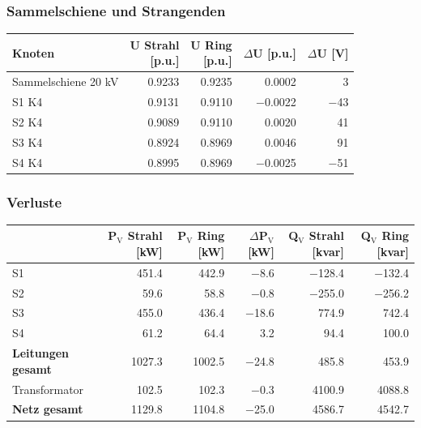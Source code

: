 \documentclass[11pt,a4paper]{article}
\begin{document}
\subsubsection{Sammelschiene und Strangenden}

\begin{table}[H]
\centering
\begin{adjustbox}{max width=\linewidth}
\begin{tabular}{lrrrr}
\toprule
\textbf{Knoten} & \thead{U Strahl \\ {[p.u.]}} & \thead{U Ring \\ {[p.u.]}} & \thead{$\Delta$U \\ {[p.u.]}} & \thead{$\Delta$U \\ {[V]}} \\
\midrule
Sammelschiene 20 kV & 0.9233 & 0.9235 & 0.0002 & 3 \\
S1 K4 & 0.9131 & 0.9110 & $-$0.0022 & $-$43 \\
S2 K4 & 0.9089 & 0.9110 & 0.0020 & 41 \\
S3 K4 & 0.8924 & 0.8969 & 0.0046 & 91 \\
S4 K4 & 0.8995 & 0.8969 & $-$0.0025 & $-$51 \\
\bottomrule
\end{tabular}
\end{adjustbox}
\end{table}

\subsubsection{Verluste}

\begin{table}[H]
\centering
\begin{adjustbox}{max width=\linewidth}
\begin{tabular}{lrrrrr}
\toprule
\textbf{} & \thead{P$_\mathrm{V}$ Strahl \\ {[kW]}} & \thead{P$_\mathrm{V}$ Ring \\ {[kW]}} & \thead{$\Delta$P$_\mathrm{V}$ \\ {[kW]}} & \thead{Q$_\mathrm{V}$ Strahl \\ {[kvar]}} & \thead{Q$_\mathrm{V}$ Ring \\ {[kvar]}} \\
\midrule
S1 & 451.4 & 442.9 & $-$8.6 & $-$128.4 & $-$132.4 \\
S2 & 59.6 & 58.8 & $-$0.8 & $-$255.0 & $-$256.2 \\
S3 & 455.0 & 436.4 & $-$18.6 & 774.9 & 742.4 \\
S4 & 61.2 & 64.4 & 3.2 & 94.4 & 100.0 \\
\textbf{Leitungen gesamt} & 1027.3 & 1002.5 & $-$24.8 & 485.8 & 453.9 \\
Transformator & 102.5 & 102.3 & $-$0.3 & 4100.9 & 4088.8 \\
\textbf{Netz gesamt} & 1129.8 & 1104.8 & $-$25.0 & 4586.7 & 4542.7 \\
\bottomrule
\end{tabular}
\end{adjustbox}
\end{table}
\end{document}
